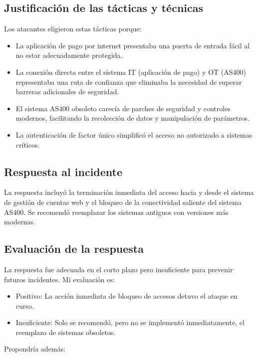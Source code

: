 \subsection{Justificación de las tácticas y técnicas}
Los atacantes eligieron estas tácticas porque:

\begin{itemize}
    \item La aplicación de pago por internet presentaba una puerta de entrada fácil al no estar adecuadamente protegida.
    
    \item La conexión directa entre el sistema IT (aplicación de pago) y OT (AS400) representaba una ruta de confianza que eliminaba la necesidad de superar barreras adicionales de seguridad.
    
    \item El sistema AS400 obsoleto carecía de parches de seguridad y controles modernos, facilitando la recolección de datos y manipulación de parámetros.
    
    \item La autenticación de factor único simplificó el acceso no autorizado a sistemas críticos.
\end{itemize}

\subsection{Respuesta al incidente}
La respuesta incluyó la terminación inmediata del acceso hacia y desde el sistema de gestión de cuentas web y el bloqueo de la conectividad saliente del sistema AS400. Se recomendó reemplazar los sistemas antiguos con versiones más modernas.

\subsection{Evaluación de la respuesta}
La respuesta fue adecuada en el corto plazo pero insuficiente para prevenir futuros incidentes. Mi evaluación es:

\begin{itemize}
    \item Positivo: La acción inmediata de bloqueo de accesos detuvo el ataque en curso.
    \item Insuficiente: Solo se recomendó, pero no se implementó inmediatamente, el reemplazo de sistemas obsoletos.
\end{itemize}

Propondría además:

